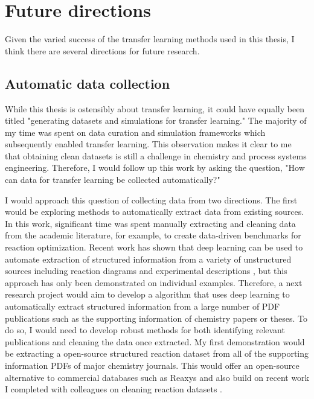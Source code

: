 \section{Future directions}

Given the varied success of the transfer learning methods used in this thesis, I think there are several directions for future research.



\subsection{Automatic data collection}

While this thesis is ostensibly about transfer learning, it could have equally been titled "generating datasets and simulations for transfer learning." The majority of my time was spent on data curation and simulation frameworks which subsequently enabled transfer learning.  This observation makes it clear to me that obtaining clean datasets is still a challenge in chemistry and process systems engineering. Therefore, I would follow up this work by asking the question, "How can data for transfer learning be collected automatically?"

I would approach this question of collecting data from two directions. The first would be exploring methods to automatically extract data from existing sources. In this work, significant time was spent manually extracting and cleaning data from the academic literature, for example, to create data-driven benchmarks for reaction optimization. Recent work has shown that deep learning can be used to automate extraction of structured information from a variety of unstructured sources including reaction diagrams\cite{Qian2023} and experimental descriptions \cite{Guo2021}, but this approach has only been demonstrated on individual examples. Therefore, a next research project would aim to develop a algorithm that uses deep learning to  automatically extract structured information from a large number of PDF publications such as the supporting information of chemistry papers or theses. To do so, I would need to develop robust methods for both identifying relevant publications and cleaning the data once extracted.  My first demonstration would be extracting a open-source structured reaction dataset from all of the supporting information PDFs of major chemistry journals. This would offer an open-source alternative to commercial databases such as Reaxys and also build on recent work I completed with colleagues on cleaning reaction datasets \cite{Wigh2023}.

